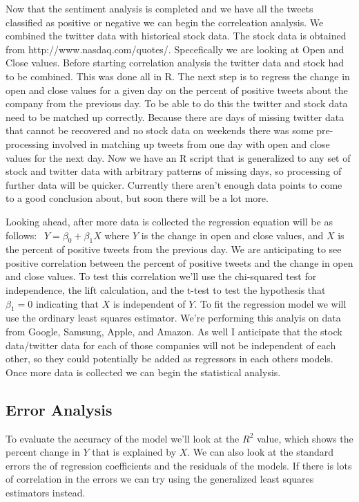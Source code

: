 \documentclass{acm_proc_article-sp}
\begin{document}
Now that the sentiment analysis is completed and we have all the tweets
classified as positive or negative we can begin the correleation analysis. We
combined the twitter data with historical stock data. The stock data is
obtained from http://www.nasdaq.com/quotes/. Specefically we are looking at
Open and Close values. Before starting correlation analysis the twitter data
and stock had to be combined. This was done all in R. The next step is to
regress the change in open and close values for a given day on the percent of
positive tweets about the company from the previous day. To be able to do this
the twitter and stock data need to be matched up correctly. Because there are
days of missing twitter data that cannot be recovered and no stock data on
weekends there was some pre-processing involved in matching up tweets from one
day with open and close values for the next day. Now we have an R script that
is generalized to any set of stock and twitter data with arbitrary patterns of
missing days, so processing of further data will be quicker. Currently there
aren't enough data points to come to a good conclusion about, but soon there
will be a lot more.

Looking ahead, after more data is collected the regression equation will be as
follows: $ \ \ Y = \beta_0 + \beta_1X $ where $Y$ is the change in open and
close values, and $X$ is the percent of positive tweets from the previous day.
We are anticipating to see positive correlation between the percent of positive
tweets and the change in open and close values. To test this correlation we'll
use the chi-squared test for independence, the lift calculation, and the t-test
to test the hypothesis that $\beta_1 = 0$ indicating that $X$ is independent of
$Y$. To fit the regression model we will use the ordinary least squares
estimator. We're performing this analyis on data from Google, Samsung, Apple,
and Amazon. As well I anticipate that the stock data/twitter data for each of
those companies will not be independent of each other, so they could
potentially be added as regressors in each others models. Once more data is
collected we can begin the statistical analysis. 

\subsection{Error Analysis}

To evaluate the accuracy of the model we'll look at the $R^2$ value, which
shows the percent change in $Y$ that is explained by $X$. We can also look at
the standard errors the of regression coefficients and the residuals of the
models. If there is lots of correlation in the errors we can try using the
generalized least squares estimators instead. 
\end{document}
